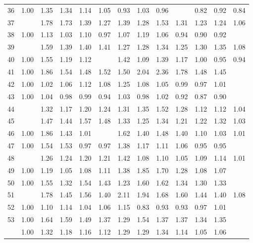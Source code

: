 \begin{tabular}{rrrrrrrrrrrrr}
  36 & 1.00 & 1.35 & 1.34 & 1.14 & 1.05 & 0.93 & 1.03 & 0.96 & \color{blue}{0.81} & 0.82 & 0.92 & 0.84 \\ 
  37 & \color{blue}{1.00} & 1.78 & 1.73 & 1.39 & 1.27 & 1.39 & 1.28 & 1.53 & 1.31 & 1.23 & 1.24 & 1.06 \\ 
  38 & 1.00 & 1.13 & 1.03 & 1.10 & 0.97 & 1.07 & 1.19 & 1.06 & 0.94 & 0.90 & 0.92 & \color{blue}{0.90} \\ 
  39 & \color{blue}{1.00} & 1.59 & 1.39 & 1.40 & 1.41 & 1.27 & 1.28 & 1.34 & 1.25 & 1.30 & 1.35 & 1.08 \\ 
  40 & 1.00 & 1.55 & 1.19 & 1.12 & \color{blue}{0.93} & 1.42 & 1.09 & 1.39 & 1.17 & 1.00 & 0.95 & 0.94 \\ 
  41 & 1.00 & 1.86 & 1.54 & 1.48 & 1.52 & 1.50 & 2.04 & 2.36 & 1.78 & 1.48 & 1.45 & \color{blue}{0.97} \\ 
  42 & 1.00 & 1.02 & 1.06 & 1.12 & 1.08 & 1.25 & 1.08 & 1.05 & 0.99 & 0.97 & 1.01 & \color{blue}{0.92} \\ 
  43 & 1.00 & 1.04 & 0.98 & 0.99 & 0.94 & 1.03 & 0.98 & 1.02 & 0.92 & 0.87 & 0.90 & \color{blue}{0.81} \\ 
  44 & \color{blue}{1.00} & 1.32 & 1.17 & 1.20 & 1.24 & 1.31 & 1.35 & 1.52 & 1.28 & 1.12 & 1.12 & 1.04 \\ 
  45 & \color{blue}{1.00} & 1.47 & 1.44 & 1.57 & 1.48 & 1.33 & 1.25 & 1.34 & 1.21 & 1.22 & 1.32 & 1.03 \\ 
  46 & 1.00 & 1.86 & 1.43 & 1.01 & \color{blue}{0.99} & 1.62 & 1.40 & 1.48 & 1.40 & 1.10 & 1.03 & 1.01 \\ 
  47 & 1.00 & 1.54 & 1.53 & 0.97 & 0.97 & 1.38 & 1.17 & 1.11 & 1.06 & 0.95 & 0.95 & \color{blue}{0.92} \\ 
  48 & \color{blue}{1.00} & 1.26 & 1.24 & 1.20 & 1.21 & 1.42 & 1.08 & 1.10 & 1.05 & 1.09 & 1.14 & 1.01 \\ 
  49 & 1.00 & 1.19 & 1.05 & 1.08 & 1.11 & 1.38 & 1.85 & 1.70 & 1.28 & 1.08 & 1.07 & \color{blue}{0.98} \\ 
  50 & 1.00 & 1.55 & 1.32 & 1.54 & 1.43 & 1.23 & 1.60 & 1.62 & 1.34 & 1.30 & 1.33 & \color{blue}{0.96} \\ 
  51 & \color{blue}{1.00} & 1.78 & 1.45 & 1.56 & 1.40 & 2.11 & 1.94 & 1.68 & 1.60 & 1.44 & 1.40 & 1.08 \\ 
  52 & 1.00 & 1.10 & 1.14 & 1.04 & 1.06 & 1.15 & 0.83 & 0.93 & 0.93 & 0.97 & 1.01 & \color{blue}{0.79} \\ 
  53 & 1.00 & 1.64 & 1.59 & 1.49 & 1.37 & 1.29 & 1.54 & 1.37 & 1.37 & 1.34 & 1.35 & \color{blue}{0.87} \\ 
   \hline
 & 1.00 & 1.32 & 1.18 & 1.16 & 1.12 & 1.29 & 1.29 & 1.34 & 1.14 & 1.05 & 1.06 & \color{blue}{0.94} \\ 
   \hline
\end{tabular}

